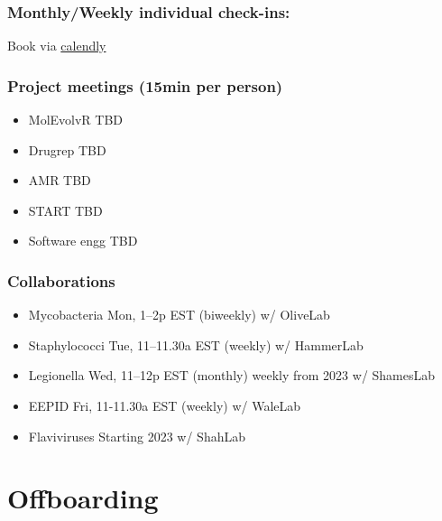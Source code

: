 \documentclass[
  letterpaper,
  DIV=11,
  numbers=noendperiod]{scrreprt}
\providecommand{\tightlist}{%
  \setlength{\itemsep}{0pt}\setlength{\parskip}{0pt}}\usepackage{longtable,booktabs,array}
\begin{document}
\hypertarget{monthlyweekly-individual-check-ins}{%
\subsection{Monthly/Weekly individual
check-ins:}\label{monthlyweekly-individual-check-ins}}

Book via \href{https://calendly.com/jananiravi}{calendly}

\hypertarget{project-meetings-15min-per-person}{%
\subsection{Project meetings (15min per
person)}\label{project-meetings-15min-per-person}}

\begin{itemize}
\tightlist
\item
  MolEvolvR \textbar{} TBD
\item
  Drugrep \textbar{} TBD
\item
  AMR \textbar{} TBD
\item
  START \textbar{} TBD
\item
  Software engg \textbar{} TBD
\end{itemize}

\hypertarget{collaborations}{%
\subsection{Collaborations}\label{collaborations}}

\begin{itemize}
\tightlist
\item
  Mycobacteria \textbar{} Mon, 1--2p EST (biweekly) \textbar{} w/
  OliveLab
\item
  Staphylococci \textbar{} Tue, 11--11.30a EST (weekly) \textbar{} w/
  HammerLab
\item
  Legionella \textbar{} Wed, 11--12p EST (monthly) \textbar{} weekly
  from 2023 \textbar{} w/ ShamesLab
\item
  EEPID \textbar{} Fri, 11-11.30a EST (weekly) \textbar{} w/ WaleLab
\item
  Flaviviruses \textbar{} Starting 2023 \textbar{} w/ ShahLab
\end{itemize}


\hypertarget{offboarding}{%
\chapter{Offboarding}\label{offboarding}}
\end{document}
